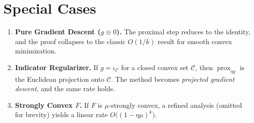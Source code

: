 \documentclass{article}
\newcommand{\prox}{\operatorname{prox}}
\begin{document}
\section*{Special Cases}
\begin{enumerate}
\item \textbf{Pure Gradient Descent ($g\equiv0$).} The proximal step reduces to the identity, and the proof collapses to the classic $O(1/k)$ result for smooth convex minimization.
\item \textbf{Indicator Regularizer.} If $g=\iota_{\mathcal{C}}$ for a closed convex set $\mathcal{C}$, then $\prox_{\eta g}$ is the Euclidean projection onto $\mathcal{C}$. The method becomes \emph{projected gradient descent}, and the same rate holds.
\item \textbf{Strongly Convex $F$.} If $F$ is $\mu$‑strongly convex, a refined analysis (omitted for brevity) yields a linear rate $O\bigl((1-\eta\mu)^{k}\bigr)$.
\end{enumerate}
\end{document}
